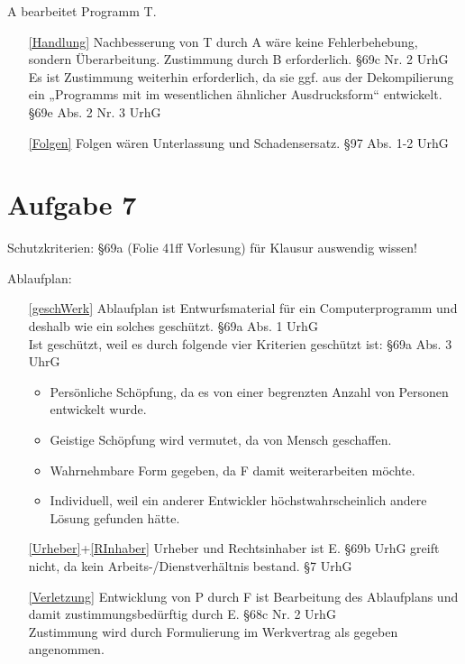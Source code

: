 \documentclass{scrreprt}
\begin{document}
\begin{anumerate}
\begin{itemize}
\end{itemize}
\item A bearbeitet Programm T.
\begin{itemize}
\item[\ref{Handlung}] Nachbesserung von T durch A wäre keine Fehlerbehebung, sondern Überarbeitung. Zustimmung durch B erforderlich. \hfill §69c Nr. 2 UrhG\\
Es ist Zustimmung weiterhin erforderlich, da sie ggf. aus der Dekompilierung ein „Programms mit im wesentlichen ähnlicher Ausdrucksform“ entwickelt. \hfill §69e Abs. 2 Nr. 3 UrhG
\item[\ref{Folgen}] Folgen wären Unterlassung und Schadensersatz. \hfill §97 Abs. 1-2 UrhG
\end{itemize}
\end{anumerate}

\chapter{Aufgabe 7}
Schutzkriterien: §69a (Folie 41ff Vorlesung) für Klausur auswendig wissen!

\noindent{}Ablaufplan:
\begin{itemize}
\item[\ref{geschWerk}] Ablaufplan ist Entwurfsmaterial für ein Computerprogramm und deshalb wie ein solches geschützt. \hfill §69a Abs. 1 UrhG\\
Ist geschützt, weil es durch folgende vier Kriterien geschützt ist: \hfill §69a Abs. 3 UhrG
\begin{itemize}
\item Persönliche Schöpfung, da es von einer begrenzten Anzahl von Personen entwickelt wurde.
\item Geistige Schöpfung wird vermutet, da von Mensch geschaffen.
\item Wahrnehmbare Form gegeben, da F damit weiterarbeiten möchte.
\item Individuell, weil ein anderer Entwickler höchstwahrscheinlich andere Lösung gefunden hätte.
\end{itemize}
\item[\ref{Urheber}+\ref{RInhaber}] Urheber und Rechtsinhaber ist E. §69b UrhG greift nicht, da kein Arbeits-/Dienstverhältnis bestand. \hfill §7 UrhG
\item[\ref{Verletzung}] Entwicklung von P durch F ist Bearbeitung des Ablaufplans und damit zustimmungsbedürftig durch E. \hfill §68c Nr. 2 UrhG\\
Zustimmung wird durch Formulierung im Werkvertrag als gegeben angenommen.
\end{itemize}
\end{document}
